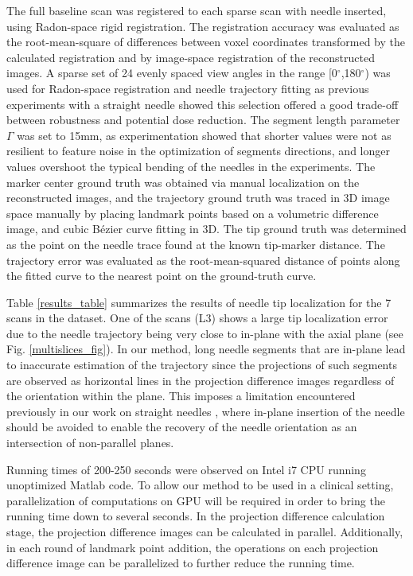 The full baseline scan was registered to each sparse scan with needle inserted, using Radon-space rigid registration. The registration accuracy was evaluated as the root-mean-square of differences between voxel coordinates transformed by the calculated registration and by image-space registration of the reconstructed images. 
A sparse set of 24 evenly spaced view angles in the range [0$^\circ$,180$^\circ$) was used for Radon-space registration and needle trajectory fitting as previous experiments \cite{medan2017reduced} with a straight needle showed this selection offered a good trade-off between robustness and potential dose reduction. The segment length parameter $\Gamma$ was set to 15mm, as experimentation showed that shorter values were not as resilient to feature noise in the optimization of segments directions, and longer values overshoot the typical bending of the needles in the experiments.
The marker center ground truth was obtained via manual localization on the reconstructed images, and the trajectory ground truth was traced in 3D image space manually by placing landmark points based on a volumetric difference image, and cubic B\'ezier curve fitting in 3D. The tip ground truth was determined as the point on the needle trace found at the known tip-marker distance. The trajectory error was evaluated as the root-mean-squared distance of points along the fitted curve to the nearest point on the ground-truth curve.

Table \ref{results_table} summarizes the results of needle tip localization for the 7 scans in the dataset. One of the scans (L3) shows a large tip localization error due to the needle trajectory being very close to in-plane with the axial plane (see Fig. \ref{multislices_fig}). In our method, long needle segments that are in-plane lead to inaccurate estimation of the trajectory since the projections of such segments are observed as horizontal lines in the projection difference images regardless of the orientation within the plane. This imposes a limitation encountered previously in our work on straight needles \cite{medan2017reduced}, where in-plane insertion of the needle should be avoided to enable the recovery of the needle orientation as an intersection of non-parallel planes.

Running times of 200-250 seconds were observed on Intel i7 CPU running unoptimized Matlab code. To allow our method to be used in a clinical setting, parallelization of computations on GPU will be required in order to bring the running time down to several seconds. In the projection difference calculation stage, the projection difference images can be calculated in parallel. Additionally, in each round of landmark point addition, the operations on each projection difference image can be parallelized to further reduce the running time.

